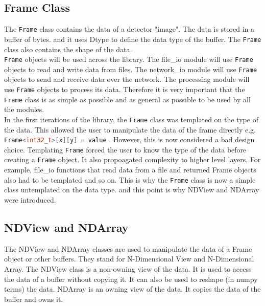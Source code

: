 \begin{spacing}{1.2}
    \subsection{Frame Class}
    The \lstinline|Frame| class contains the data of a detector "image". The data is stored in a buffer of bytes.
    and it uses Dtype to define the data type of the buffer. The \lstinline|Frame| class also contains the shape
    of the data.\\

    \lstinline|Frame| objects will be used across the library. The file\_io module will use \lstinline|Frame| objects to read
    and write data from files. The network\_io module will use \lstinline|Frame| objects to send and receive data
    over the network. The processing module will use \lstinline|Frame| objects to process its data. Therefore
    it is very important that the \lstinline|Frame| class is as simple as possible and as general as possible
    to be used by all the modules.\\

    In the first iterations of the library, the \lstinline|Frame| class was templated on the type of the data.
    This allowed the user to manipulate the data of the frame directly e.g. \lstinline[language=C++]|Frame<int32_t>[x][y] = value| .
    However, this is now considered a bad design choice. Templating \lstinline|Frame| forced the user to know the type
    of the data before creating a \lstinline|Frame| object. It also propoagated complexity to higher level
    layers. For example, file\_io functions that read data from a file and returned
    Frame objects also had to be templated and so on. This is why the \lstinline|Frame| class is now a simple class untemplated
    on the data type. and this point is why NDView and NDArray were introduced.

    \subsection{NDView and NDArray}
    The NDView and NDArray classes are used to manipulate the data of a Frame object or other buffers. They stand for
    N-Dimensional View and N-Dimensional Array. The NDView class is a non-owning view of the data. It is used to access
    the data of a buffer without copying it. It can also be used to reshape (in numpy terms) the data. NDArray is an
    owning view of the data. It copies the data of the buffer and owns it.\\


\end{spacing}
